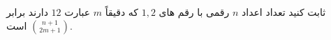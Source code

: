 \exercise
ثابت کنید تعداد اعداد
$n$
 رقمی با رقم های
$1, 2$
که دقیقاً
$m$
عبارت
$12$
دارند برابر
$\binom{n+1}{2m+1}$
است.